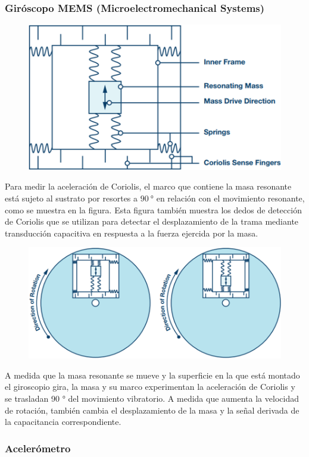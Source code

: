 \begin{frame}
    \frametitle{Giróscopo MEMS (Microelectromechanical Systems)}
    \footnotesize

    \begin{figure}[!h]
        \centering
        \includegraphics[width=0.3\columnwidth]{images/gyroscope_mems_structure.png}
    \end{figure}


    Para medir la aceleración de Coriolis, el marco que contiene la masa resonante está sujeto al sustrato por resortes a $\SI{90}{\degree}$ en relación con el movimiento resonante, como se muestra en la figura. Esta figura también muestra los dedos de detección de Coriolis que se utilizan para detectar el desplazamiento de la trama mediante transducción capacitiva en respuesta a la fuerza ejercida por la masa.

    \begin{figure}[!h]
        \centering
        \includegraphics[width=0.4\columnwidth]{images/gyroscope_mems_3.png}
    \end{figure}

    A medida que la masa resonante se mueve y la superficie en la que está montado el giroscopio gira, la masa y su marco experimentan la aceleración de Coriolis y se trasladan 90 ° del movimiento vibratorio. A medida que aumenta la velocidad de rotación, también cambia el desplazamiento de la masa y la señal derivada de la capacitancia correspondiente.
\end{frame}



\begin{frame}
    \frametitle{Acelerómetro}

\end{frame}
